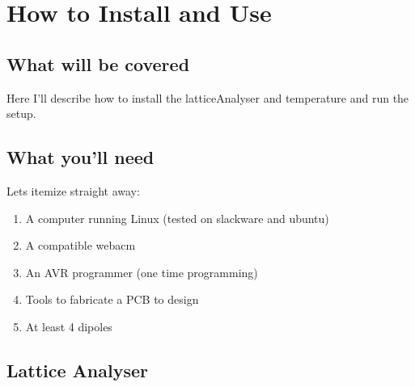 \chapter{How to Install and Use}

\section{What will be covered}
	Here I'll describe how to install the latticeAnalyser and temperature and run the setup.

\section{What you'll need}
	Lets itemize straight away:
	\begin{enumerate}
		\item A computer running Linux (tested on slackware and ubuntu)
		\item A compatible webacm
		\item An AVR programmer (one time programming)
		\item Tools to fabricate a PCB to design
		\item At least 4 dipoles
	\end{enumerate}

\section{Lattice Analyser}
